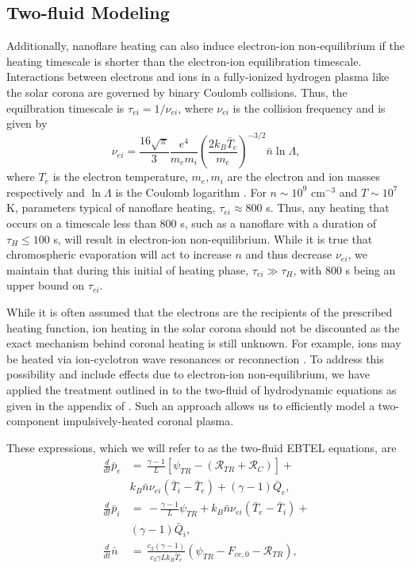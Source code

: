 \documentclass[apj]{emulateapj}
\begin{document}
	\subsection{Two-fluid Modeling}
	\label{subsec:two_fluid_theory}
	\par Additionally, nanoflare heating can also induce electron-ion non-equilibrium if the heating timescale is shorter than the electron-ion equilibration timescale. Interactions between electrons and ions in a fully-ionized hydrogen plasma like the solar corona are governed by binary Coulomb collisions. Thus, the equilbration timescale is $\tau_{ei}=1/\nu_{ei}$, where $\nu_{ei}$ is the collision frequency and is given by
	\begin{equation}
		\nu_{ei} = \frac{16\sqrt{\pi}}{3}\frac{e^4}{m_em_i}\left(\frac{2k_B\bar{T}_e}{m_e}\right)^{-3/2}\bar{n}\ln{\Lambda},
	\end{equation}
	where $T_e$ is the electron temperature, $m_e,m_i$ are the electron and ion masses respectively and $\ln{\Lambda}$ is the Coulomb logarithm \citep[see Eq. 2.5e and Section 3 of][]{braginskii_transport_1965}. For $n\sim10^9$ cm$^{-3}$ and $T\sim10^{7}$ K, parameters typical of nanoflare heating, $\tau_{ei}\approx800$ s. Thus, any heating that occurs on a timescale less than 800 s, such as a nanoflare with a duration of $\tau_H\le100$ s, will result in electron-ion non-equilibrium. While it is true that chromospheric evaporation will act to increase $n$ and thus decrease $\nu_{ei}$, we maintain that during this initial of heating phase, $\tau_{ei}\gg\tau_H$, with 800 s being an upper bound on $\tau_{ei}$. 
	\par While it is often assumed that the electrons are the recipients of the prescribed heating function, ion heating in the solar corona should not be discounted as the exact mechanism behind coronal heating is still unknown. For example, ions may be heated via ion-cyclotron wave resonances \citep{markovskii_intermittent_2004} or reconnection \citep{ono_ion_1996,drake_onset_2014}. To address this possibility and include effects due to electron-ion non-equilibrium, we have applied the treatment outlined in \citet{klimchuk_highly_2008} to the two-fluid of hydrodynamic equations as given in the appendix of \citet{bradshaw_influence_2013}. Such an approach allows us to efficiently model a two-component impulsively-heated coronal plasma.
	\par These expressions, which we will refer to as the two-fluid EBTEL equations, are
	\begin{align}
		\frac{d}{dt}\bar{p}_e &=\,\frac{\gamma - 1}{L}[\psi_{TR} - (\mathcal{R}_{TR} + \mathcal{R}_C)] + \nonumber \\ & k_B\bar{n}\nu_{ei}(\bar{T}_i-\bar{T}_e) + (\gamma-1)\bar{Q}_{e},\label{eq:press_e_0d_2fl} \\[0.5em]
		\frac{d}{dt}\bar{p}_i &=\,-\frac{\gamma - 1}{L}\psi_{TR} + k_B\bar{n}\nu_{ei}(\bar{T}_e-\bar{T}_i) + \nonumber \\ &(\gamma-1)\bar{Q}_{i},\label{eq:press_i_0d_2fl} \\[0.5em]
		\frac{d}{dt}\bar{n} &=\,\frac{c_2(\gamma-1)}{c_3\gamma Lk_B\bar{T}_e}(\psi_{TR} - F_{ce,0}-\mathcal{R}_{TR}),	\label{eq:mass_0d_2fl}
	\end{align}
\end{document}
